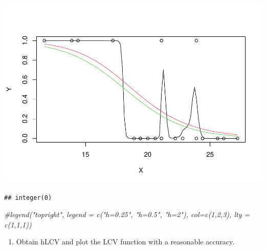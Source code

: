 \documentclass[
]{article}
\newenvironment{Shaded}{\begin{snugshade}}{\end{snugshade}}
\newcommand{\CommentTok}[1]{\textcolor[rgb]{0.56,0.35,0.01}{\textit{#1}}}
\providecommand{\tightlist}{%
  \setlength{\itemsep}{0pt}\setlength{\parskip}{0pt}}
\begin{document}
\includegraphics{prueba_files/figure-latex/unnamed-chunk-3-1.pdf}

\begin{verbatim}
## integer(0)
\end{verbatim}

\begin{Shaded}
\begin{Highlighting}[]
\CommentTok{\#legend("topright", legend = c("h=0.25", "h=0.5", "h=2"), col=c(1,2,3), lty = c(1,1,1)) }
\end{Highlighting}
\end{Shaded}

\begin{enumerate}
\def\labelenumi{\alph{enumi}.}
\setcounter{enumi}{1}
\tightlist
\item
  Obtain hLCV and plot the LCV function with a reasonable accuracy.
\end{enumerate}
\end{document}
